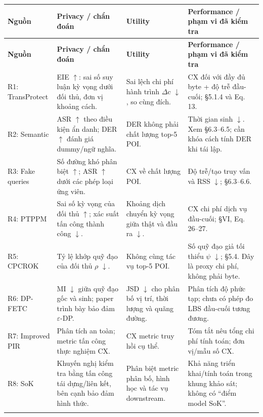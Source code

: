 \documentclass[10pt,a4paper]{article}
\begin{document}
\begingroup\small
\begin{longtable}{@{}P{2.710cm}P{4.936cm}P{4.065cm}P{4.646cm}@{}}
\toprule
\textbf{Nguồn} & \textbf{Privacy / chẩn đoán} & \textbf{Utility} & \textbf{Performance / phạm vi đã kiểm tra}\\\midrule
\endfirsthead
\toprule
\textbf{Nguồn} & \textbf{Privacy / chẩn đoán} & \textbf{Utility} & \textbf{Performance / phạm vi đã kiểm tra}\\\midrule
\endhead
\bottomrule\endfoot
R1: TransProtect & EIE $\uparrow$: sai số suy luận kỳ vọng dưới đối thủ, đơn vị khoảng cách. & Sai lệch chi phí hành trình $\Delta$c $\downarrow$, so cùng đích. & CX đối với đầy đủ byte + độ trễ đầu-cuối; §5.1.4 và Eq. 13.\\
\addlinespace[3pt]
R2: Semantic & ASR $\uparrow$ theo điều kiện ẩn danh; DER $\uparrow$ đánh giá dummy/ngữ nghĩa. & DER không phải chất lượng top-5 POI. & Thời gian sinh $\downarrow$. Xem §6.3–6.5; cần khóa cách tính DER khi tái lập.\\
\addlinespace[3pt]
R3: Fake queries & Số đường khó phân biệt $\uparrow$; ASR $\uparrow$ dưới các phép loại ứng viên. & CX về chất lượng POI. & Độ trễ/tạo truy vấn và RSS $\downarrow$; §6.3–6.6.\\
\addlinespace[3pt]
R4: PTPPM & Sai số kỳ vọng của đối thủ $\uparrow$; xác suất tấn công thành công $\downarrow$. & Khoảng dịch chuyển kỳ vọng giữa thật và đầu ra $\downarrow$. & CX chi phí dịch vụ đầu-cuối; §VI, Eq. 26–27.\\
\addlinespace[3pt]
R5: CPCROK & Tỷ lệ khớp quỹ đạo của đối thủ $\rho$ $\downarrow$. & Không cùng tác vụ top-5 POI. & Số quỹ đạo giả tối thiểu $\psi$ $\downarrow$; §5.4. Đây là proxy chi phí, không phải byte.\\
\addlinespace[3pt]
R6: DP-FETC & MI $\downarrow$ giữa quỹ đạo gốc và sinh; paper trình bày bảo đảm $\varepsilon$-DP. & JSD $\downarrow$ cho phân bố vị trí, thời lượng và quãng đường. & Phân tích độ phức tạp; chưa có phép đo LBS đầu-cuối tương đương.\\
\addlinespace[3pt]
R7: Improved PIR & Phân tích an toàn; metric tấn công thực nghiệm CX. & CX metric truy hồi cụ thể. & Tóm tắt nêu tổng chi phí tính toán; đơn vị/mẫu số CX.\\
\addlinespace[3pt]
R8: SoK & Khuyến nghị kiểm tra bằng tấn công tái dựng/liên kết, bên cạnh bảo đảm hình thức. & Phân biệt metric phân bố, hình học và tác vụ downstream. & Khả năng triển khai/tính toán trong khung khảo sát; không có “điểm model SoK”.\\
\addlinespace[3pt]

\end{longtable}
\end{document}

